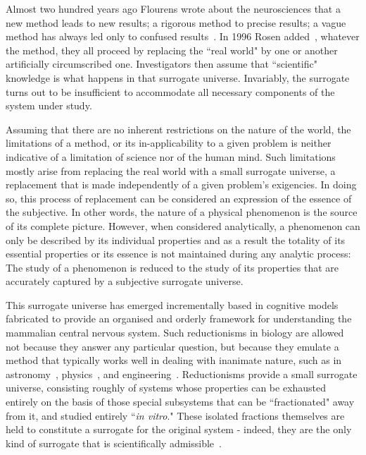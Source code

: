 \documentclass[10pt,letterpaper]{article}
\begin{document}
Almost two hundred years ago Flourens wrote about the neurosciences that a new method leads to new results; a rigorous method to precise results; a vague method has always led only to confused results~\cite{flourens24}.  In 1996 Rosen added~\cite{rosen96}, whatever the method, they all proceed by replacing the ``real world" by one or another artificially circumscribed one. Investigators then assume that ``scientific" knowledge is what happens in that surrogate universe. Invariably, the surrogate turns out to be insufficient to accommodate all necessary components of the system under study. 

Assuming that there are no inherent restrictions on the nature of the world, the limitations of a method, or its in-applicability to a given problem is neither indicative of a limitation of science nor of the human mind.  Such limitations mostly arise from replacing the real world with a small surrogate universe, a replacement that is made independently of a given problem's exigencies. In doing so, this process of replacement can be considered an expression of the essence of the subjective. In other words, the nature of a physical phenomenon is the source of its complete picture. However, when considered analytically, a phenomenon can only be described by its individual properties and as a result the totality of its essential properties or its essence is not maintained during any analytic process: The study of a phenomenon is reduced to the study of its properties that are accurately captured by a subjective surrogate universe.

This surrogate universe has emerged incrementally based in cognitive models fabricated to provide an organised and orderly framework for understanding the mammalian central nervous system. Such reductionisms  in biology are allowed not because they answer any particular question, but because they emulate a method that typically works well in dealing with inanimate nature, such as in astronomy~\cite{rosen71}, physics~\cite{einstein23}, and engineering~\cite{shannon48}. Reductionisms provide a small surrogate universe, consisting roughly of systems whose properties can be exhausted entirely on the basis of those special subsystems that can be ``fractionated" away from it, and studied entirely ``\textit{in vitro}." These isolated fractions themselves are held to constitute a surrogate for the original system - indeed, they are the only kind of surrogate that is scientifically admissible~\cite{rosen96}. 
\end{document}
